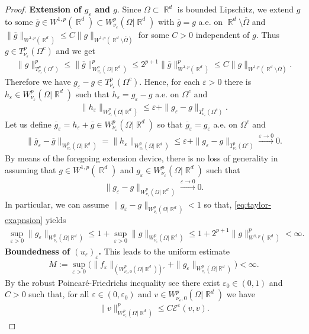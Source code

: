\documentclass[12pt, reqno]{amsart}%
\theoremstyle{plain}  %
\theoremstyle{definition}  %
\numberwithin{equation}{section}
\DeclareMathOperator{\R}{\mathbb{R}}
\newcommand{\eps}{\varepsilon}
\newcommand{\WnuOmRa}{W^p_{\nu_\eps}(\Omega|\R^d )}
\newcommand{\WnuOmRao}{W^p_{\nu_\eps,0}(\Omega|\R^d)}
\newcommand{\TnuOma}{T^p_{\nu_\eps} (\Omega^c)}
\begin{document}
\begin{proof}
\textbf{Extension of $g_\eps$ and $g$}. Since  $\Omega\subset \R^d$ is bounded Lipschitz, we extend $g$ to some $\overline{g}\in W^{1,p}(\R^d)\subset\WnuOmRa$ with
$\overline{g}= g$ a.e. on $\R^d\setminus\overline{\Omega}$ and $\|\overline{g}\|_{W^{1,p}(\R^d)}\leq C\|g\|_{W^{1,p}(\R^d\setminus\overline{\Omega})}$ for some  $C>0$ independent of $g$. Thus  $g\in \TnuOma$ and we get
\begin{align*}
\|g\|^p_{\TnuOma}\leq \|\overline{g}\|^p_{\WnuOmRa} \leq 2^{p+1} \|\overline{g}\|^p_{W^{1,p}(\R^d)}\leq C\|g\|_{W^{1,p}(\R^d\setminus\overline{\Omega})}.
\end{align*}
Therefore we have $g_\eps-g\in \TnuOma$. Hence, for each $\eps>0$ there is $h_\eps\in \WnuOmRa$ such that $h_\eps= g_\eps-g$ a.e. on $\Omega^c$ and
\begin{align*}
\|h_\eps\|_{\WnuOmRa}\leq \eps+ \|g_\eps-g\|_{\TnuOma}.
\end{align*}
Let us define $ \overline{g}_\eps= h_\eps +\overline{g}\in\WnuOmRa$ so that $\overline{g}_\eps= g_\eps$ a.e. on $\Omega^c$ and
\begin{align}\label{eq:geps-extens}
\|\overline{g}_\eps-\overline{g}\|_{\WnuOmRa}= \|h_\eps\|_{\WnuOmRa}\leq \eps+ \|g_\eps-g\|_{\TnuOma}\xrightarrow{\eps\to0}0.
\end{align}
By means of the foregoing extension device, there is no loss of generality in assuming that $g \in W^{1,p}(\R^d) $ and $g_\eps \in \WnuOmRa$ such that
\begin{align*}
\|g_\eps-g \|_{\WnuOmRa}\xrightarrow{\eps\to0}0.
\end{align*}
In particular, we can assume $\|g_\eps-g \|_{\WnuOmRa}<1$ so that, \eqref{eq:taylor-exapnsion} yields
\begin{align*}
\sup_{\eps>0}\|g_\eps \|_{\WnuOmRa}\leq 1+ \sup_{\eps>0}
\|g \|_{\WnuOmRa}\leq 1+  2^{p+1} \|g\|^p_{W^{1,p}(\R^d)}<\infty.
\end{align*}
\textbf{Boundedness of $(u_\eps)_\eps$.} This leads to  the uniform estimate
\begin{align}\label{eq:uniform-bdd-f-g-D}
M:= 	\sup_{\eps>0}\big(\|f_\eps \|_{(\WnuOmRao)'}+\|g_\eps \|_{\WnuOmRa}\big)<\infty.
\end{align}
By the robust Poincar\'e-Friedrichs inequality see  \cite[Section 10]{Fog25} there exist $\eps_0 \in (0,1)$ and $C>0$ such that, for all $\eps\in (0, \eps_0)$ and $v \in\WnuOmRao$ we have
%
\begin{align}\label{eq:uniform-coercivity-D}
\|v\|^p_{\WnuOmRa}\leq C\mathcal{E}^\eps(v,v).
\end{align}


\end{proof}
\end{document}
